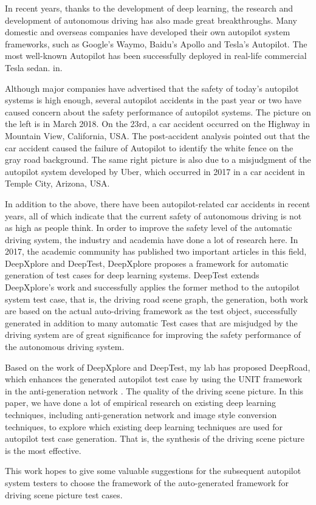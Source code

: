 \begin{eabstract}
  In recent years, thanks to the development of deep learning, the research and development of autonomous driving has also made great breakthroughs. Many domestic and overseas companies have developed their own autopilot system frameworks, such as Google's Waymo, Baidu's Apollo and Tesla's Autopilot. The most well-known Autopilot has been successfully deployed in real-life commercial Tesla sedan. in.

  Although major companies have advertised that the safety of today's autopilot systems is high enough, several autopilot accidents in the past year or two have caused concern about the safety performance of autopilot systems. The picture on the left is in March 2018. On the 23rd, a car accident occurred on the Highway in Mountain View, California, USA. The post-accident analysis pointed out that the car accident caused the failure of Autopilot to identify the white fence on the gray road background. The same right picture is also due to a misjudgment of the autopilot system developed by Uber, which occurred in 2017 in a car accident in Temple City, Arizona, USA.

  In addition to the above, there have been autopilot-related car accidents in recent years, all of which indicate that the current safety of autonomous driving is not as high as people think. In order to improve the safety level of the automatic driving system, the industry and academia have done a lot of research here. In 2017, the academic community has published two important articles in this field, DeepXplore\cite{DeepXplore} and DeepTest\cite{ DeepTest}, DeepXplore proposes a framework for automatic generation of test cases for deep learning systems. DeepTest extends DeepXplore's work and successfully applies the former method to the autopilot system test case, that is, the driving road scene graph, the generation, both work are based on the actual auto-driving framework as the test object, successfully generated in addition to many automatic Test cases that are misjudged by the driving system are of great significance for improving the safety performance of the autonomous driving system.

  Based on the work of DeepXplore and DeepTest, my lab has proposed DeepRoad\cite{DeepRoad}, which enhances the generated autopilot test case by using the UNIT\cite{UNIT} framework in the anti-generation network \cite{GAN}. The quality of the driving scene picture. In this paper, we have done a lot of empirical research on existing deep learning techniques, including anti-generation network and image style conversion techniques, to explore which existing deep learning techniques are used for autopilot test case generation. That is, the synthesis of the driving scene picture is the most effective.

  This work hopes to give some valuable suggestions for the subsequent autopilot system testers to choose the framework of the auto-generated framework for driving scene picture test cases.
\end{eabstract}

